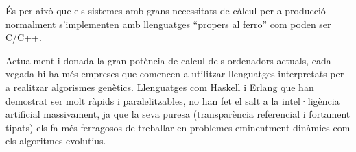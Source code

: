 És per això que els sistemes amb grans necessitats de càlcul per a producció
normalment s'implementen amb llenguatges ``propers al ferro'' com poden ser
C/C++. 

Actualment i donada la gran potència de calcul dels ordenadors actuals, cada
vegada hi ha més empreses que comencen a utilitzar llenguatges interpretats per
a realitzar algorismes genètics. Llenguatges com Haskell i Erlang que han
demostrat ser molt ràpids i paralelitzables, no han fet el salt a la
intel·ligència artificial massivament, ja que la seva puresa (transparència
referencial i fortament tipats) els fa més ferragosos de treballar en problemes
eminentment dinàmics com els algoritmes evolutius.


% 
%


%

